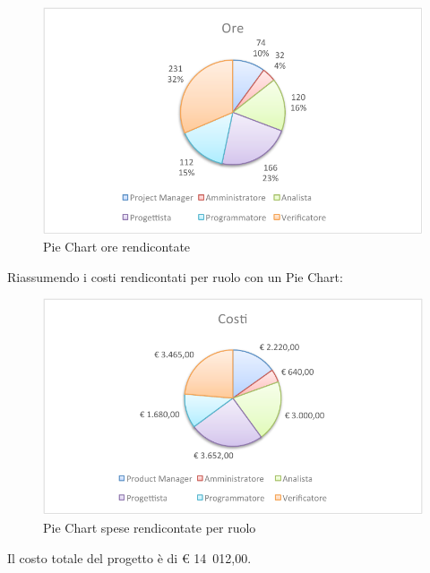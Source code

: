 			\begin{figure}[H]\centering
				\includegraphics[width=\textwidth]{PianoDiProgetto/Pics/ChartTotOreRendic.pdf}
				\caption{Pie Chart ore rendicontate}
			\end{figure}
			Riassumendo i costi rendicontati per ruolo con un Pie Chart:
			\begin{figure}[H]\centering
				\includegraphics[width=\textwidth]{PianoDiProgetto/Pics/ChartTotCostiRendic.pdf}
				\caption{Pie Chart spese rendicontate per ruolo}
			\end{figure}
		Il costo totale del progetto è di \euro{} 14~012,00.